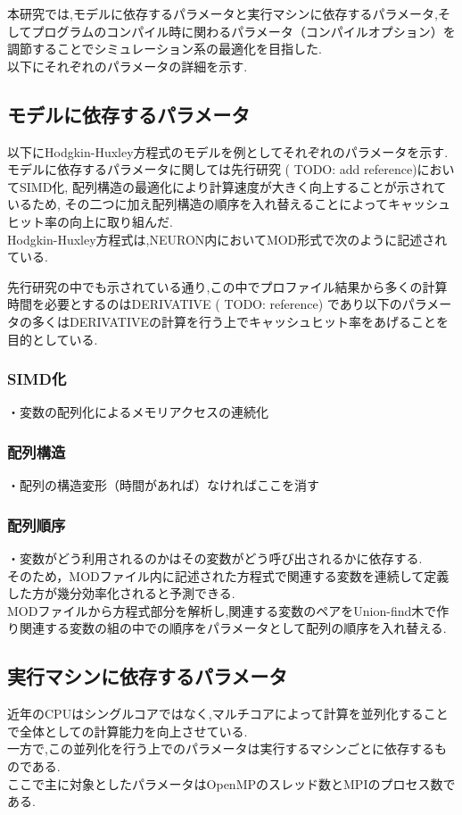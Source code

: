 本研究では,モデルに依存するパラメータと実行マシンに依存するパラメータ,そしてプログラムのコンパイル時に関わるパラメータ（コンパイルオプション）を調節することでシミュレーション系の最適化を目指した.\\
以下にそれぞれのパラメータの詳細を示す.\\
\subsection{モデルに依存するパラメータ}
以下にHodgkin-Huxley方程式のモデルを例としてそれぞれのパラメータを示す.\\
モデルに依存するパラメータに関しては先行研究 ( TODO: add reference)においてSIMD化, 配列構造の最適化により計算速度が大きく向上することが示されているため,
その二つに加え配列構造の順序を入れ替えることによってキャッシュヒット率の向上に取り組んだ.\\
Hodgkin-Huxley方程式は,NEURON内においてMOD形式で次のように記述されている.\\
{\footnotesize

}
先行研究の中でも示されている通り,この中でプロファイル結果から多くの計算時間を必要とするのはDERIVATIVE ( TODO: reference)
であり以下のパラメータの多くはDERIVATIVEの計算を行う上でキャッシュヒット率をあげることを目的としている.\\
\subsubsection{SIMD化}
・変数の配列化によるメモリアクセスの連続化
\subsubsection{配列構造}
・配列の構造変形（時間があれば）なければここを消す
\subsubsection{配列順序}
・変数がどう利用されるのかはその変数がどう呼び出されるかに依存する.\\
そのため，MODファイル内に記述された方程式で関連する変数を連続して定義した方が幾分効率化されると予測できる.\\
MODファイルから方程式部分を解析し,関連する変数のペアをUnion-find木で作り関連する変数の組の中での順序をパラメータとして配列の順序を入れ替える.\\
\subsection{実行マシンに依存するパラメータ}
近年のCPUはシングルコアではなく,マルチコアによって計算を並列化することで全体としての計算能力を向上させている.\\
一方で,この並列化を行う上でのパラメータは実行するマシンごとに依存するものである.\\
ここで主に対象としたパラメータはOpenMPのスレッド数とMPIのプロセス数である.\\
